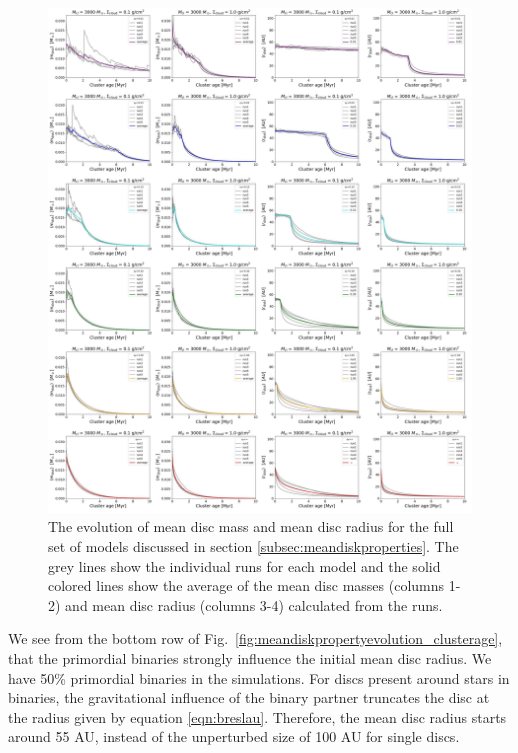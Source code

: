 \documentclass[fleqn,usenatbib]{mnras}
\begin{document}
\begin{figure}
    \centering
    \includegraphics[width=\textwidth]{figures/PanelDiscPropertyEvolution_individualruns.pdf}
    \caption{The evolution of mean disc mass and mean disc radius for the full set of models discussed in section \ref{subsec:meandiskproperties}. The grey lines show the individual runs for each model and the solid colored lines show the average of the mean disc masses (columns 1-2) and mean disc radius (columns 3-4) calculated from the runs.}
    \label{fig:meandiskpropertiesallmodels}
\end{figure}

We see from the bottom row of Fig.~\ref{fig:meandiskpropertyevolution_clusterage}, that the primordial binaries strongly influence the initial mean disc radius. We have 50\% primordial binaries in the simulations. For discs present around stars in binaries, the gravitational influence of the binary partner truncates the disc at the radius given by equation \ref{eqn:breslau}.  Therefore, the mean disc radius starts around 55 AU, instead of the unperturbed size of 100 AU for single discs.
\end{document}
